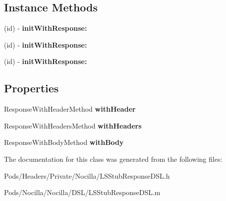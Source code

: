 \subsection*{Instance Methods}
\begin{DoxyCompactItemize}
\item 
\hypertarget{interface_l_s_stub_response_d_s_l_a2b3c1bb29055f3cd60aeaf9b4c77a31d}{(id) -\/ {\bfseries init\-With\-Response\-:}}\label{interface_l_s_stub_response_d_s_l_a2b3c1bb29055f3cd60aeaf9b4c77a31d}

\item 
\hypertarget{interface_l_s_stub_response_d_s_l_a2b3c1bb29055f3cd60aeaf9b4c77a31d}{(id) -\/ {\bfseries init\-With\-Response\-:}}\label{interface_l_s_stub_response_d_s_l_a2b3c1bb29055f3cd60aeaf9b4c77a31d}

\item 
\hypertarget{interface_l_s_stub_response_d_s_l_a2b3c1bb29055f3cd60aeaf9b4c77a31d}{(id) -\/ {\bfseries init\-With\-Response\-:}}\label{interface_l_s_stub_response_d_s_l_a2b3c1bb29055f3cd60aeaf9b4c77a31d}

\end{DoxyCompactItemize}
\subsection*{Properties}
\begin{DoxyCompactItemize}
\item 
\hypertarget{interface_l_s_stub_response_d_s_l_a3d02979dc7cff0514ee49b553888180e}{Response\-With\-Header\-Method {\bfseries with\-Header}}\label{interface_l_s_stub_response_d_s_l_a3d02979dc7cff0514ee49b553888180e}

\item 
\hypertarget{interface_l_s_stub_response_d_s_l_aac9413912fba82a2fea2813491b4ce1b}{Response\-With\-Headers\-Method {\bfseries with\-Headers}}\label{interface_l_s_stub_response_d_s_l_aac9413912fba82a2fea2813491b4ce1b}

\item 
\hypertarget{interface_l_s_stub_response_d_s_l_a7a1593ea5c1cf3b18bcfff9501b25735}{Response\-With\-Body\-Method {\bfseries with\-Body}}\label{interface_l_s_stub_response_d_s_l_a7a1593ea5c1cf3b18bcfff9501b25735}

\end{DoxyCompactItemize}


The documentation for this class was generated from the following files\-:\begin{DoxyCompactItemize}
\item 
Pods/\-Headers/\-Private/\-Nocilla/L\-S\-Stub\-Response\-D\-S\-L.\-h\item 
Pods/\-Nocilla/\-Nocilla/\-D\-S\-L/L\-S\-Stub\-Response\-D\-S\-L.\-m\end{DoxyCompactItemize}
